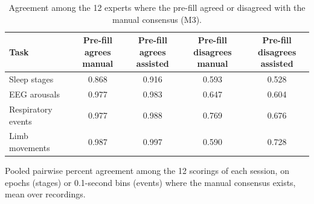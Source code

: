 \begin{table}[h!]
\centering
\footnotesize
\caption{Agreement among the 12 experts where the pre-fill agreed or disagreed with the manual consensus (M3).}
\label{tab:s-m3}
\begin{adjustbox}{max width=\linewidth}
\begin{tabular}{lcccc}
\toprule
Task & \makecell{Pre-fill agrees\\manual} & \makecell{Pre-fill agrees\\assisted} & \makecell{Pre-fill disagrees\\manual} & \makecell{Pre-fill disagrees\\assisted} \\
\midrule
Sleep stages & 0.868 & 0.916 & 0.593 & 0.528 \\
EEG arousals & 0.977 & 0.983 & 0.647 & 0.604 \\
Respiratory events & 0.977 & 0.988 & 0.769 & 0.676 \\
Limb movements & 0.987 & 0.997 & 0.590 & 0.728 \\
\bottomrule
\end{tabular}
\end{adjustbox}
\par\smallskip
\begin{minipage}{0.95\linewidth}\footnotesize Pooled pairwise percent agreement among the 12 scorings of each session, on epochs (stages) or 0.1-second bins (events) where the manual consensus exists, mean over recordings.\end{minipage}
\end{table}
